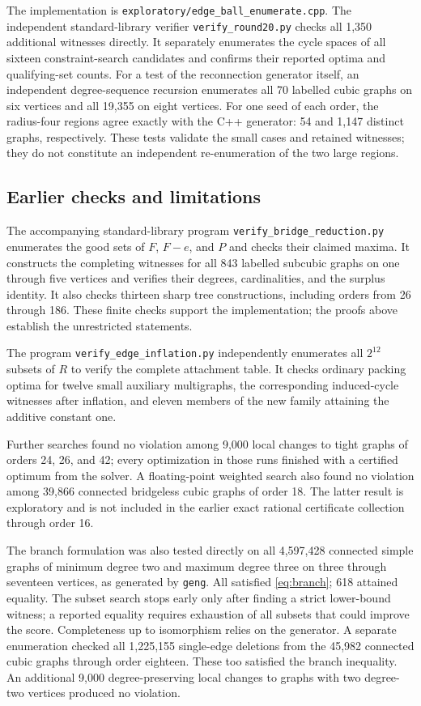 \documentclass[11pt]{article}
\begin{document}
The implementation is \texttt{exploratory/edge\_ball\_enumerate.cpp}.
The independent standard-library verifier \texttt{verify\_round20.py}
checks all 1,350 additional witnesses directly. It separately
enumerates the cycle spaces of all sixteen constraint-search
candidates and confirms their reported optima and qualifying-set
counts. For a test of the reconnection generator itself, an independent
degree-sequence recursion enumerates all 70 labelled cubic graphs
on six vertices and all 19,355 on eight vertices. For one seed of
each order, the radius-four regions agree exactly with the C++
generator: 54 and 1,147 distinct graphs, respectively. These tests
validate the small cases and retained witnesses; they do not constitute
an independent re-enumeration of the two large regions.

\subsection{Earlier checks and limitations}
The accompanying standard-library program
\texttt{verify\_bridge\_reduction.py} enumerates the good sets of $F$,
$F-e$, and $P$ and checks their claimed maxima.
It constructs the completing witnesses for all 843 labelled
subcubic graphs on one through five vertices and verifies their
degrees, cardinalities, and the surplus identity.
It also checks thirteen sharp tree constructions, including orders
from 26 through 186. These finite checks support the implementation;
the proofs above establish the unrestricted statements.

The program \texttt{verify\_edge\_inflation.py} independently
enumerates all $2^{12}$ subsets of $R$ to verify the complete
attachment table. It checks ordinary packing optima for twelve
small auxiliary multigraphs, the corresponding induced-cycle
witnesses after inflation, and eleven members of the new family
attaining the additive constant one.

Further searches found no violation among 9,000 local changes to
tight graphs of orders 24, 26, and 42; every optimization in those
runs finished with a certified optimum from the solver.
A floating-point weighted search also found no violation among
39,866 connected bridgeless cubic graphs of order 18. The latter
result is exploratory and is not included in the earlier exact
rational certificate collection through order 16.

The branch formulation was also tested directly on all 4,597,428
connected simple graphs of minimum degree two and maximum degree
three on three through seventeen vertices, as generated by
\texttt{geng}. All satisfied \eqref{eq:branch}; 618 attained equality.
The subset search stops early only after finding a strict lower-bound
witness; a reported equality requires exhaustion of all subsets that
could improve the score. Completeness up to isomorphism relies on
the generator. A separate enumeration checked all 1,225,155
single-edge deletions from the 45,982 connected cubic graphs through
order eighteen. These too satisfied the branch inequality.
An additional 9,000 degree-preserving local changes to graphs with
two degree-two vertices produced no violation.
\end{document}

